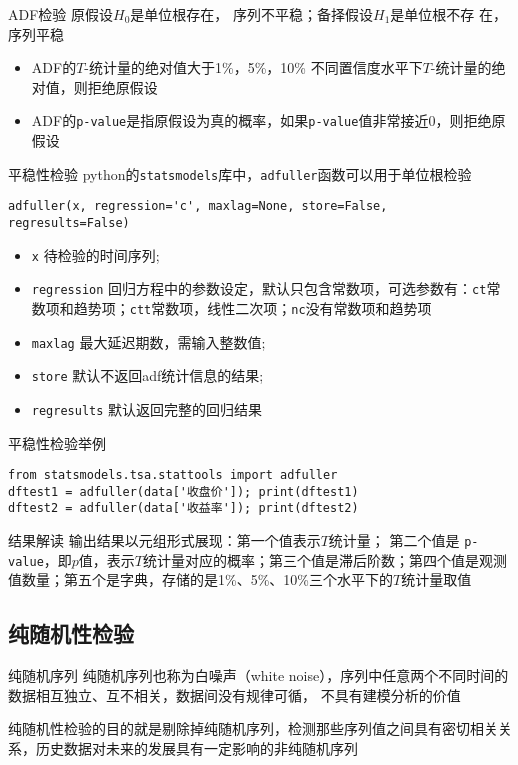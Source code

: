 \documentclass[t]{beamer}
\begin{document}
\begin{frame}[fragile]{ADF检验}
原假设$H_0$是单位根存在，
序列不平稳；备择假设$H_1$是单位根不存
在，序列平稳
\begin{itemize}
    \item ADF的$T$-统计量的绝对值大于1\%，5\%，10\% 不同置信度水平下$T$-统计量的绝 对值，则拒绝原假设
    \item ADF的\verb|p-value|是指原假设为真的概率，如果\verb|p-value|值非常接近0，则拒绝原假设
\end{itemize}
\end{frame}


\begin{frame}[fragile]{平稳性检验}
python的\verb|statsmodels|库中，\verb|adfuller|函数可以用于单位根检验
\begin{lstlisting}
adfuller(x, regression='c', maxlag=None, store=False, regresults=False)
\end{lstlisting}
\begin{itemize}
    \item \verb|x| 待检验的时间序列; 
    \item \verb|regression| 回归方程中的参数设定，默认只包含常数项，可选参数有：\verb|ct|常数项和趋势项；\verb|ctt|常数项，线性二次项；\verb|nc|没有常数项和趋势项
    \item \verb|maxlag| 最大延迟期数，需输入整数值; 
    \item \verb|store| 默认不返回adf统计信息的结果; 
    \item \verb|regresults|  默认返回完整的回归结果
\end{itemize}
\end{frame}


\begin{frame}[fragile]{平稳性检验举例}
\begin{lstlisting}
from statsmodels.tsa.stattools import adfuller
dftest1 = adfuller(data['收盘价']); print(dftest1)
dftest2 = adfuller(data['收益率']); print(dftest2)
\end{lstlisting}

\begin{block}{结果解读}
输出结果以元组形式展现：第一个值表示$T$统计量；
第二个值是 \verb|p-value|，即$p$值，表示$T$统计量对应的概率；第三个值是滞后阶数；第四个值是观测值数量；第五个是字典，存储的是1\%、5\%、10\%三个水平下的$T$统计量取值
\end{block}
\end{frame}

\subsection{纯随机性检验}
\begin{frame}[fragile]{纯随机序列}
    纯随机序列也称为白噪声（white noise），序列中任意两个不同时间的数据相互独立、互不相关，数据间没有规律可循，
    不具有建模分析的价值

    纯随机性检验的目的就是剔除掉纯随机序列，检测那些序列值之间具有密切相关关系，历史数据对未来的发展具有一定影响的非纯随机序列
\end{frame}
\end{document}
